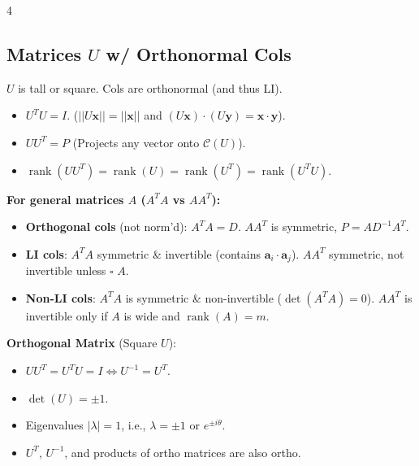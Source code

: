 \documentclass[9pt]{extarticle}
\begin{document}
\begin{multicols*}{4}
\subsection*{Matrices $U$ w/ Orthonormal Cols}
$U$ is tall or square. Cols are orthonormal (and thus LI).
\begin{itemize}
    \item $U^{T}U=I$. ($||U\mathbf{x}||=||\mathbf{x}||$ and $(U\mathbf{x})\cdot(U\mathbf{y})=\mathbf{x}\cdot \mathbf{y}$).
    \item $UU^T=P$ (Projects any vector onto $\mathcal{C}(U)$).
    \item $\operatorname{rank}(UU^{T})=\operatorname{rank}(U)=\operatorname{rank}(U^{T})=\operatorname{rank}(U^{T}U)$.
\end{itemize}

\textbf{For general matrices $A$  ($A^TA$ vs $AA^T$):}
\begin{itemize}
    \item \textbf{Orthogonal cols} (not norm'd): $A^TA=D$. $AA^T$ is symmetric, $P = A D^{-1} A^T$.
    \item \textbf{LI cols}: $A^TA$ symmetric \& invertible (contains $\mathbf{a}_i \cdot \mathbf{a}_j$). $AA^T$ symmetric, not invertible unless $\square$ $A$.
    \item \textbf{Non-LI cols}: $A^TA$ is symmetric \& non-invertible ($\det(A^TA)=0$). $AA^T$ is invertible only if $A$ is wide and $\operatorname{rank}(A)=m$.
\end{itemize}

\textbf{Orthogonal Matrix} (Square $U$):
\begin{itemize}
    \item $UU^T = U^{T}U=I \Leftrightarrow U^{-1}=U^{T}$.
    \item $\det(U)=\pm 1$.
    \item Eigenvalues $|\lambda|=1$, i.e., $\lambda=\pm 1$ or $e^{\pm i\theta}$.
    \item $U^T$, $U^{-1}$, and products of ortho matrices are also ortho.
\end{itemize}


\end{multicols*}
\end{document}
